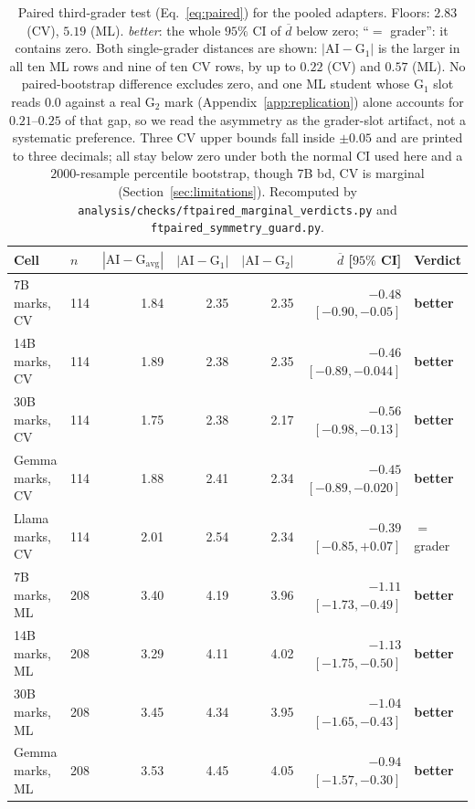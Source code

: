 \begin{table}[t]
\centering
\caption{Paired third-grader test (Eq.~\eqref{eq:paired}) for the pooled adapters. Floors: $2.83$ (CV), $5.19$ (ML). \emph{better}: the whole $95\%$ CI of $\overline{d}$ below zero; ``$=$ grader'': it contains zero. Both single-grader distances are shown: $|\mathrm{AI}-\mathrm{G}_1|$ is the larger in all ten ML rows and nine of ten CV rows, by up to $0.22$ (CV) and $0.57$ (ML). No paired-bootstrap difference excludes zero, and one ML student whose G$_1$ slot reads $0.0$ against a real G$_2$ mark (Appendix~\ref{app:replication}) alone accounts for $0.21$--$0.25$ of that gap, so we read the asymmetry as the grader-slot artifact, not a systematic preference. Three CV upper bounds fall inside $\pm 0.05$ and are printed to three decimals; all stay below zero under both the normal CI used here and a $2000$-resample percentile bootstrap, though 7B bd, CV is marginal (Section~\ref{sec:limitations}). Recomputed by \texttt{analysis/checks/ftpaired\_marginal\_verdicts.py} and \texttt{ftpaired\_symmetry\_guard.py}.}
\label{tab:ftpaired}
\small
\setlength{\tabcolsep}{4.5pt}
\begin{tabular}{llrrrrl}
\toprule
Cell & $n$ & $|\mathrm{AI}{-}\mathrm{G}_{\mathrm{avg}}|$ & $|\mathrm{AI}{-}\mathrm{G}_1|$ & $|\mathrm{AI}{-}\mathrm{G}_2|$ & $\overline{d}$ [$95\%$ CI] & Verdict \\
\midrule
7B marks, CV     & 114 & 1.84 & 2.35 & 2.35 & $-0.48$ $[-0.90, -0.05]$ & \textbf{better} \\
14B marks, CV    & 114 & 1.89 & 2.38 & 2.35 & $-0.46$ $[-0.89, -0.044]$ & \textbf{better} \\
30B marks, CV    & 114 & 1.75 & 2.38 & 2.17 & $-0.56$ $[-0.98, -0.13]$ & \textbf{better} \\
Gemma marks, CV  & 114 & 1.88 & 2.41 & 2.34 & $-0.45$ $[-0.89, -0.020]$ & \textbf{better} \\
Llama marks, CV  & 114 & 2.01 & 2.54 & 2.34 & $-0.39$ $[-0.85, +0.07]$ & $=$ grader \\
7B marks, ML     & 208 & 3.40 & 4.19 & 3.96 & $-1.11$ $[-1.73, -0.49]$ & \textbf{better} \\
14B marks, ML    & 208 & 3.29 & 4.11 & 4.02 & $-1.13$ $[-1.75, -0.50]$ & \textbf{better} \\
30B marks, ML    & 208 & 3.45 & 4.34 & 3.95 & $-1.04$ $[-1.65, -0.43]$ & \textbf{better} \\
Gemma marks, ML  & 208 & 3.53 & 4.45 & 4.05 & $-0.94$ $[-1.57, -0.30]$ & \textbf{better} \\

\end{tabular}
\end{table}
